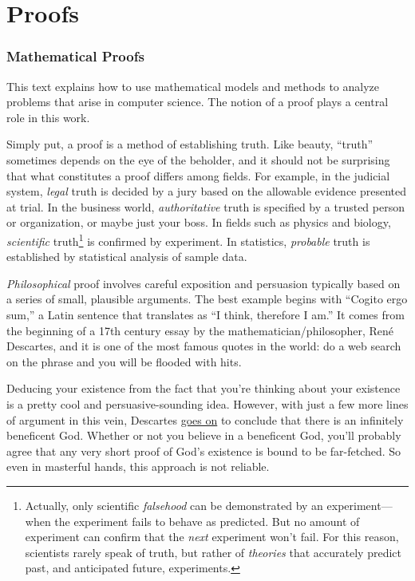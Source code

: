 \part{Proofs}


\section*{Mathematical Proofs}

This text explains how to use mathematical models and methods to
analyze problems that arise in computer science.  The notion of a
proof plays a central role in this work.

Simply put, a proof is a method of establishing truth.  Like beauty,
``truth'' sometimes depends on the eye of the beholder, and
it should not be surprising that what constitutes a proof differs
among fields.  For example, in the judicial system, \emph{legal} truth
is decided by a jury based on the allowable evidence presented at
trial.  In the business world, \emph{authoritative} truth is specified
by a trusted person or organization, or maybe just your boss.  In
fields such as physics and biology, \emph{scientific}
truth\footnote{Actually, only scientific
\emph{falsehood} can be demonstrated by an experiment---when
the experiment fails to behave as predicted.  But no amount of
experiment can confirm that the \emph{next} experiment won't fail.
For this reason, scientists rarely speak of truth, but rather
of \emph{theories} that accurately predict past, and anticipated
future, experiments.} is confirmed by experiment.  In
statistics, \emph{probable} truth is established by statistical
analysis of sample data.

\emph{Philosophical} proof involves careful exposition and
persuasion typically based on a series of small, plausible arguments.
The best example begins with ``Cogito ergo sum,'' a Latin sentence
that translates as ``I think, therefore I am.''  It comes from the
beginning of a 17th century essay by the mathematician/philosopher,
Ren\'e Descartes, and it is one of the most famous quotes in the
world: do a web search on the phrase and you will be flooded with
hits.

Deducing your existence from the fact that you're thinking about your
existence is a pretty cool and persuasive-sounding idea.
However, with just a few more lines of argument in this vein, Descartes
\href{http://www.btinternet.com/~glynhughes/squashed/descartes.htm}{goes
  on} to conclude that there is an infinitely beneficent God.  Whether
or not you believe in a beneficent God, you'll probably agree that any
very short proof of God's existence is bound to be far-fetched.  So even
in masterful hands, this approach is not reliable.

